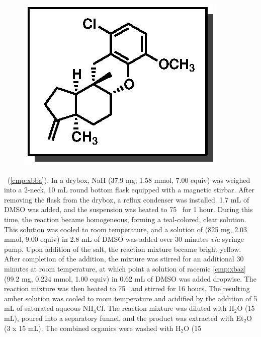 \vspace{10pt}
\begin{figure}
  \vspace{-25pt}
  \begin{center}
    \includegraphics[scale=0.8]{chp_singlecarbon/images/xbba}
  \end{center}
  \vspace{-30pt}
\end{figure}\noindent \textbf{\CMPxbba}\ (\ref{cmp:xbba}). In a drybox, NaH (37.9
mg, 1.58 mmol, 7.00 equiv) was weighed into a 2-neck, 10 mL round
bottom flask equipped with a magnetic stirbar. After removing the
flask from the drybox, a reflux condenser was installed. 1.7 mL of
DMSO was added, and the suspension was heated to 75 \degc\  for 1 hour. During this time, the
reaction became homogeneous, forming a teal-colored, clear solution. This solution was cooled to
room temperature, and a solution of  (825 mg, 2.03 mmol, 9.00 equiv) in 2.8 mL of
DMSO was added over 30 minutes \textit{via} syringe pump. Upon addition of the salt, the reaction
mixture became bright yellow. After completion of the addition, the mixture was stirred for an
additional 30 minutes at room temperature, at which point a solution of racemic \ref{cmp:xbaz} (99.2
mg, 0.224 mmol, 1.00 equiv) in 0.62 mL of DMSO was added dropwise. The reaction mixture was then
heated to 75 \degc\  and stirred for 16 hours. The resulting amber solution was cooled to room
temperature and acidified by the addition of 5 mL of saturated aqueous NH$_4$Cl.
The reaction mixture was diluted with H$_2$O (15 mL), poured into a separatory funnel, and the
product was extracted with Et$_2$O (3 x 15 mL). The combined organics were washed with H$_2$O (15
